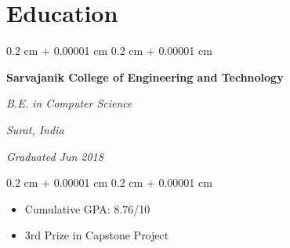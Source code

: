 \documentclass[10pt, letterpaper]{article}
\newenvironment{highlights}{
        \begin{itemize}[
            topsep=0.10 cm,
            parsep=0.10 cm,
            partopsep=0pt,
            itemsep=0pt,
            leftmargin=0.4 cm + 10pt
        ]
    }{
        \end{itemize}
    } %
\newenvironment{onecolentry}{
        \begin{adjustwidth}{
            0.2 cm + 0.00001 cm
        }{
            0.2 cm + 0.00001 cm
        }
    }{
        \end{adjustwidth}
    } %
\newenvironment{twocolentry}[2][]{
        \onecolentry
        \def\secondColumn{#2}
        \setcolumnwidth{\fill, 4.5 cm}
        \begin{paracol}{2}
    }{
        \switchcolumn \raggedleft \secondColumn
        \end{paracol}
        \endonecolentry
    } %
\begin{document}

            
            


        \section{Education}
            
        \begin{twocolentry}{
        \textit{Surat, India}    
            
        \textit{Graduated Jun 2018}}
            \textbf{Sarvajanik College of Engineering and Technology}

            \textit{B.E. in Computer Science}
        \end{twocolentry}

        \vspace{0.10 cm}
        \begin{onecolentry}
            \begin{highlights}
                \item Cumulative GPA: 8.76/10
                \item 3rd Prize in Capstone Project
            \end{highlights}
        \end{onecolentry}
\end{document}
